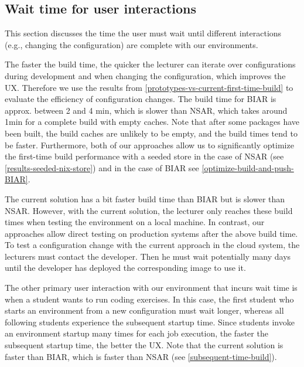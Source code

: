 \subsection{Wait time for user interactions}
This section discusses the time the user must wait until different interactions (e.g., changing the configuration) are complete with our environments. 

The faster the build time, the quicker the lecturer can iterate over configurations during development and when changing the configuration, which improves the UX. Therefore we use the results from \ref{prototypes-vs-current-first-time-build} to evaluate the efficiency of configuration changes. The build time for BIAR is approx. between 2 and 4 min, which is slower than NSAR, which takes around 1min for a complete build with empty caches. Note that after some packages have been built, the build caches are unlikely to be empty, and the build times tend to be faster. Furthermore, both of our approaches allow us to significantly optimize the first-time build performance with a seeded store in the case of NSAR (see \ref{results-seeded-nix-store}) and in the case of BIAR see \ref{optimize-build-and-push-BIAR}.

The current solution has a bit faster build time than BIAR but is slower than NSAR. However, with the current solution, the lecturer only reaches these build times when testing the environment on a local machine. In contrast, our approaches allow direct testing on production systems after the above build time. To test a configuration change with the current approach in the cloud system, the lecturers must contact the developer. Then he must wait potentially many days until the developer has deployed the corresponding image to use it.

The other primary user interaction with our environment that incurs wait time is when a student wants to run coding exercises. In this case, the first student who starts an environment from a new configuration must wait longer, whereas all following students experience the subsequent startup time. Since students invoke an environment startup many times for each job execution, the faster the subsequent startup time, the better the UX. Note that the current solution is faster than BIAR, which is faster than NSAR (see \ref{subsequent-time-build}). 


